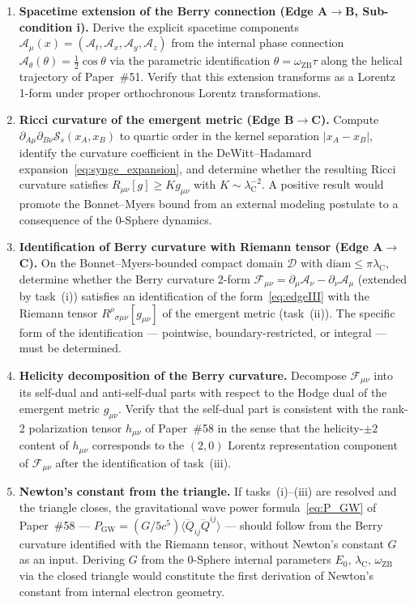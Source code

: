 \documentclass[%
 reprint, amsmath,amssymb, aps, prd, ]{revtex4-2}
\numberwithin{equation}{section}
\newcommand{\omZB}{\omega_{\text{ZB}}}
\newcommand{\lambdaC}{\lambda_{\mathrm{C}}}
\newcommand{\BerryA}{\mathcal{A}}
\newcommand{\BerryF}{\mathcal{F}}
\newcommand{\SyngeS}{\mathcal{S}}
\begin{document}
\begin{enumerate}[label=(\roman*), leftmargin=2em]

\item \textbf{Spacetime extension of the Berry connection (Edge A$\to$B, Sub-condition i).}
Derive the explicit spacetime components $\BerryA_\mu(x) = (\BerryA_t, \BerryA_x, \BerryA_y, \BerryA_z)$ from the internal phase connection $\BerryA_\theta(\theta) = \tfrac{1}{2}\cos\theta$ via the parametric identification $\theta = \omZB\tau$ along the helical trajectory of Paper~\#51.
Verify that this extension transforms as a Lorentz 1-form under proper orthochronous Lorentz transformations.

\item \textbf{Ricci curvature of the emergent metric (Edge B$\to$C).}
Compute $\partial_{A\mu}\partial_{B\nu}\SyngeS_s(x_A,x_B)$ to quartic order in the kernel separation $|x_A - x_B|$, identify the curvature coefficient in the DeWitt--Hadamard expansion~\eqref{eq:synge_expansion}, and determine whether the resulting Ricci curvature satisfies $R_{\mu\nu}[g] \geq K g_{\mu\nu}$ with $K \sim \lambdaC^{-2}$.
A positive result would promote the Bonnet--Myers bound from an external modeling postulate to a consequence of the 0-Sphere dynamics.

\item \textbf{Identification of Berry curvature with Riemann tensor (Edge A$\to$C).}
On the Bonnet--Myers-bounded compact domain $\mathcal{D}$ with $\mathrm{diam} \leq \pi\lambdaC$, determine whether the Berry curvature 2-form $\BerryF_{\mu\nu} = \partial_\mu \BerryA_\nu - \partial_\nu \BerryA_\mu$ (extended by task~(i)) satisfies an identification of the form~\eqref{eq:edgeIII} with the Riemann tensor $R^\rho{}_{\sigma\mu\nu}[g_{\mu\nu}]$ of the emergent metric (task~(ii)).
The specific form of the identification --- pointwise, boundary-restricted, or integral --- must be determined.

\item \textbf{Helicity decomposition of the Berry curvature.}
Decompose $\BerryF_{\mu\nu}$ into its self-dual and anti-self-dual parts with respect to the Hodge dual of the emergent metric $g_{\mu\nu}$.
Verify that the self-dual part is consistent with the rank-2 polarization tensor $h_{\mu\nu}$ of Paper~\#58 in the sense that the helicity-$\pm2$ content of $h_{\mu\nu}$ corresponds to the $(2,0)$ Lorentz representation component of $\BerryF_{\mu\nu}$ after the identification of task~(iii).

\item \textbf{Newton's constant from the triangle.}
If tasks~(i)--(iii) are resolved and the triangle closes, the gravitational wave power formula~\eqref{eq:P_GW} of Paper~\#58 --- $P_\mathrm{GW} = (G/5c^5)\langle\dddot{Q}_{ij}\dddot{Q}^{ij}\rangle$ --- should follow from the Berry curvature identified with the Riemann tensor, without Newton's constant $G$ as an input.
Deriving $G$ from the 0-Sphere internal parameters $E_0$, $\lambdaC$, $\omZB$ via the closed triangle would constitute the first derivation of Newton's constant from internal electron geometry.

\end{enumerate}
\end{document}
